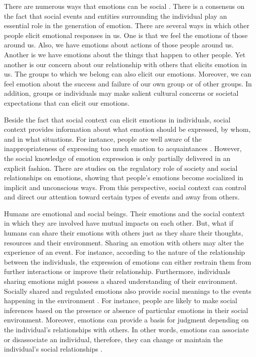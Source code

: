 \documentclass[12pt]{report}
\begin{document}
There are numerous ways that emotions can be social \cite{tiedens:social-life}.
There is a consensus on the fact that social events and entities surrounding the
individual play an essential role in the generation of emotion. There are
several ways in which other people elicit emotional responses in us. One is that
we feel the emotions of those around us. Also, we have emotions about actions of
those people around us. Another is we have emotions about the things that happen
to other people. Yet another is our concern about our relationship with others
that elicits emotion in us. The groups to which we belong can also elicit our
emotions. Moreover, we can feel emotion about the success and failure of our own
group or of other groups. In addition, groups or individuals may make salient
cultural concerns or societal expectations that can elicit our emotions.

Beside the fact that social context can elicit emotions in individuals, social
context provides information about what emotion should be expressed, by whom,
and in what situations. For instance, people are well aware of the
inappropriateness of expressing too much emotion to acquaintances
\cite{tiedens:social-life}. However, the social knowledge of emotion expression
is only partially delivered in an explicit fashion. There are studies on the
regulatory role of society and social relationships on emotions, showing that
people's emotions become socialized in implicit and unconscious ways. From this
perspective, social context can control and direct our attention toward certain
types of events and away from others.

Humans are emotional and social beings. Their emotions and the social context
in which they are involved have mutual impacts on each other. But, what if
humans can share their emotions with others just as they share their thoughts,
resources and their environment. Sharing an emotion with others may alter the
experience of an event. For instance, according to the nature of the
relationship between the individuals, the expression of emotions can either
restrain them from further interactions or improve their relationship.
Furthermore, individuals sharing emotions might possess a shared understanding
of their environment. Socially shared and regulated emotions also provide social
meanings to the events happening in the environment
\cite{wisecup:sociology-emotions}. For instance, people are likely to make
social inferences based on the presence or absence of particular emotions in
their social environment. Moreover, emotions can provide a basis for judgment
depending on the individual's relationships with others. In other words,
emotions can associate or disassociate an individual, therefore, they can change
or maintain the individual's social relationships \cite{tiedens:social-life}.
\end{document}
